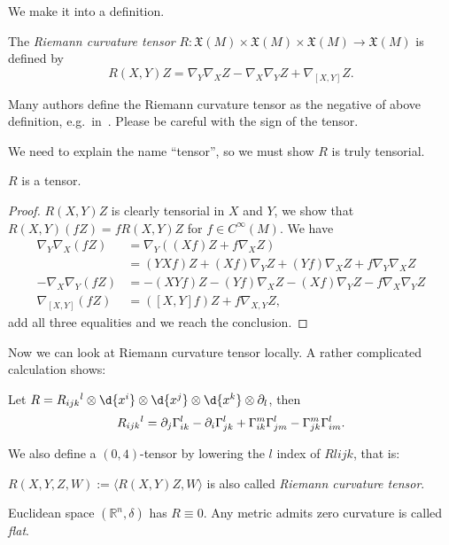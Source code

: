 We make it into a definition.

\begin{defn}
    The \emph{Riemann curvature tensor} $R:\mathfrak{X}(M)\times\mathfrak{X}(M)\times\mathfrak{X}(M)\to\mathfrak{X}(M)$ is defined by
    \[R(X,Y)Z=\nabla_Y\nabla_XZ-\nabla_X\nabla_YZ+\nabla_{[X,Y]}Z.\]
\end{defn}

\begin{rem}
    Many authors define the Riemann curvature tensor as the negative of above definition, e.g.\ in~\cite{Petersen}.
    Please be careful with the sign of the tensor.
\end{rem}

We need to explain the name ``tensor'', so we must show $R$ is truly tensorial.
\begin{lem}\label{R tensor}
    $R$ is a tensor.
\end{lem}
\begin{proof}
    $R(X,Y)Z$ is clearly tensorial in $X$ and $Y$, we show that $R(X,Y)(fZ)=fR(X,Y)Z$ for $f\in C^\infty(M)$.
    We have
    \begin{align*}
        \nabla_Y\nabla_X(fZ)&=\nabla_Y((Xf)Z+f\nabla_XZ)\\
        &=(YXf)Z+(Xf)\nabla_YZ+(Yf)\nabla_XZ+f\nabla_Y\nabla_XZ\\
        -\nabla_X\nabla_Y(fZ)&=-(XYf)Z-(Yf)\nabla_XZ-(Xf)\nabla_YZ-f\nabla_X\nabla_YZ\\
        \nabla_{[X,Y]}(fZ)&=([X,Y]f)Z+f\nabla_{{X,Y}}Z,
    \end{align*}
    add all three equalities and we reach the conclusion.
\end{proof}

Now we can look at Riemann curvature tensor locally.
A rather complicated calculation shows:
\begin{lem}
    Let $R=\R{l}{i}{j}{k}\otimes\d{x^i}\otimes\d{x^j}\otimes\d{x^k}\otimes\partial_l$, then
    \[\R{l}{i}{j}{k}=\partial_j\Gamma^l_{ik}-\partial_i\Gamma^l_{jk}+\Gamma^m_{ik}\Gamma^l_{jm}-\Gamma^m_{jk}\Gamma^l_{im}.\]
\end{lem}

We also define a $(0,4)$-tensor by lowering the $l$ index of $R{l}{i}{j}{k}$, that is:
\begin{defn}
    $R(X,Y,Z,W):=\langle R(X,Y)Z,W\rangle$ is also called \emph{Riemann curvature tensor}.
\end{defn}

\begin{eg}
    Euclidean space $(\mathbb{R}^n,\delta)$ has $R\equiv 0$.
    Any metric admits zero curvature is called \emph{flat}.
\end{eg}

